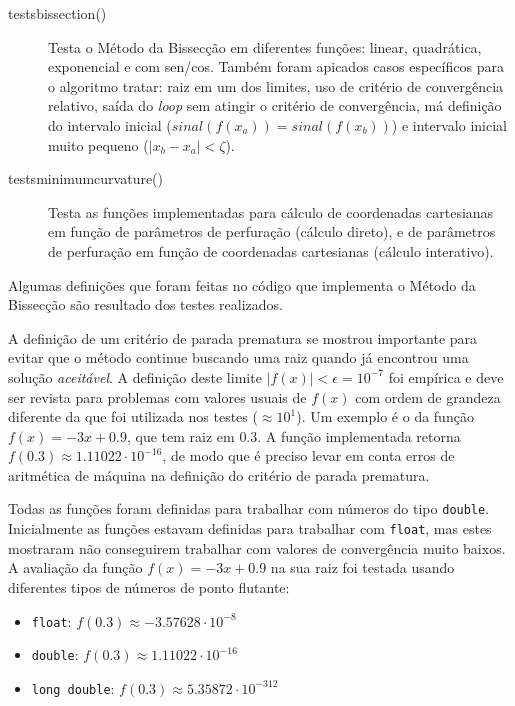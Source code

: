 \documentclass[final,3p,12pt]{elsarticle}
\begin{document}
    \begin{description}
        \item[tests\textunderscore bissection()] Testa o Método da Bissecção em diferentes funções: linear, quadrática, exponencial e com sen/cos. Também foram apicados casos específicos para o algoritmo tratar: raiz em um dos limites, uso de critério de convergência relativo, saída do \emph{loop} sem atingir o critério de convergência, má definição do intervalo inicial ($sinal(f(x_a)) = sinal(f(x_b))$) e intervalo inicial muito pequeno ($|x_b - x_a| < \zeta$).
        
        \item[tests\textunderscore minimum\textunderscore curvature()] Testa as funções implementadas para cálculo de coordenadas cartesianas em função de parâmetros de perfuração (cálculo direto), e de parâmetros de perfuração em função de coordenadas cartesianas (cálculo interativo).
    \end{description}

    Algumas definições que foram feitas no código que implementa o Método da Bissecção são resultado dos testes realizados.

    A definição de um critério de parada prematura se mostrou importante para evitar que o método continue buscando uma raiz quando já encontrou uma solução \emph{aceitável}. A definição deste limite $|f(x)| < \epsilon = 10^{-7}$ foi empírica e deve ser revista para problemas com valores usuais de $f(x)$ com ordem de grandeza diferente da que foi utilizada nos testes ($\approx 10^1$). Um exemplo é o da função $f(x) = -3x+0.9$, que tem raiz em $0.3$. A função implementada retorna $f(0.3) \approx 1.11022 \cdot 10^{-16}$, de modo que é preciso levar em conta erros de aritmética de máquina na definição do critério de parada prematura.
    
    Todas as funções foram definidas para trabalhar com números do tipo \verb|double|. Inicialmente as funções estavam definidas para trabalhar com \verb|float|, mas estes mostraram não conseguirem trabalhar com valores de convergência muito baixos. A avaliação da função $f(x) = -3x+0.9$ na sua raiz foi testada usando diferentes tipos de números de ponto flutante:

    \begin{itemize}
        \item \verb|float|: $f(0.3) \approx -3.57628 \cdot 10^{-8}$ 
        \item \verb|double|: $f(0.3) \approx 1.11022 \cdot 10^{-16}$ 
        \item \verb|long double|: $f(0.3) \approx 5.35872 \cdot 10^{-312}$ 
    \end{itemize}
    
\end{document}
